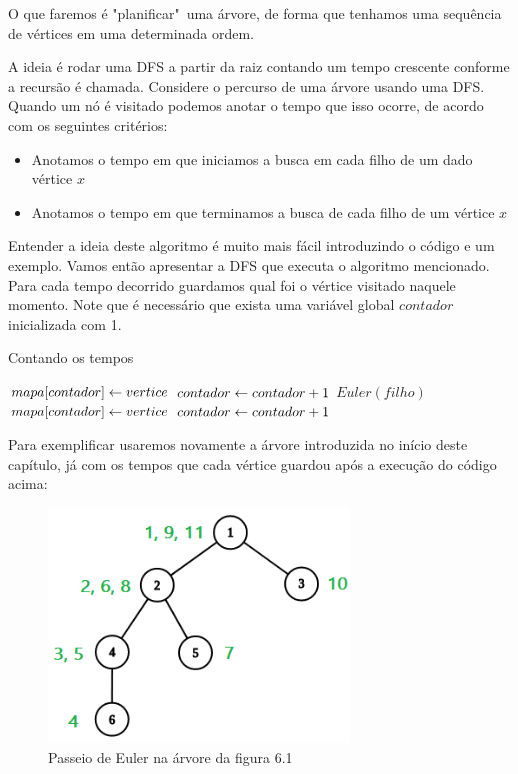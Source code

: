 O que faremos é "planificar"\ uma árvore, de forma que tenhamos uma sequência de vértices em uma determinada ordem.

A ideia é rodar uma DFS a partir da raiz contando um tempo crescente conforme a recursão é chamada. Considere o percurso de uma árvore usando uma DFS. Quando um nó é visitado podemos anotar o tempo que isso ocorre, de acordo com os seguintes critérios:

\begin{itemize}
    \item Anotamos o tempo em que iniciamos a busca em cada filho de um dado vértice $x$
    \item Anotamos o tempo em que terminamos a busca de cada filho de um vértice $x$
\end{itemize}

Entender a ideia deste algoritmo é muito mais fácil introduzindo o código e um exemplo. Vamos então apresentar a DFS que executa o algoritmo mencionado. Para cada tempo decorrido guardamos qual foi o vértice visitado naquele momento. Note que é necessário que exista uma variável global $contador$ inicializada com 1.

\vspace{10cm}

\begin{algorithm}[H]
\caption{Contando os tempos}
\begin{algorithmic}[1]
        \State $mapa[contador] \leftarrow vertice$
        \State $contador \leftarrow contador + 1$
        \State $Euler(filho)$
    \EndFor
    \State $mapa[contador] \leftarrow vertice$
    \State $contador \leftarrow contador + 1$
\EndFunction
\end{algorithmic}
\end{algorithm}


Para exemplificar usaremos novamente a árvore introduzida no início deste capítulo, já com os tempos que cada vértice guardou após a execução do código acima:

\vspace{0.5cm}

\begin{figure}[htb]
\begin{center}
\includegraphics[width=8cm]{images/graph_euler_numbered.png}
\end{center}
\caption{\label{fig:arvore-euler2}Passeio de Euler na árvore da figura 6.1}
\end{figure}

